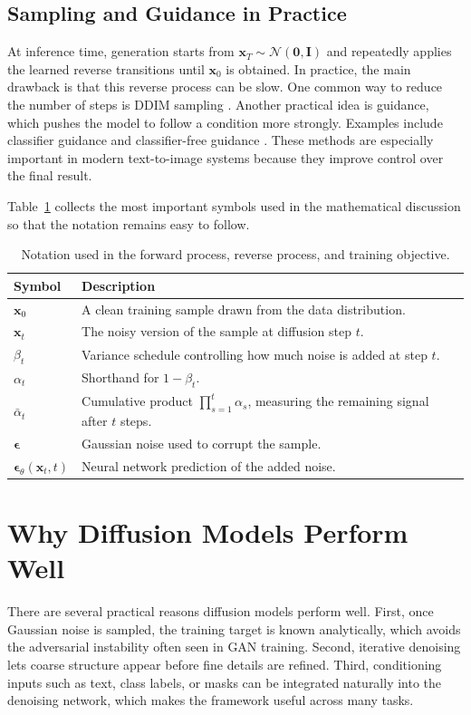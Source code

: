 \documentclass[a4paper,12pt]{article}
\newcommand{\vect}[1]{\bm{#1}}
\newcommand{\alphabar}{\bar{\alpha}}
\begin{document}
\subsection{Sampling and Guidance in Practice}
At inference time, generation starts from $\vect{x}_T \sim \mathcal{N}(\vect{0},\vect{I})$ and repeatedly applies the learned reverse transitions until $\vect{x}_0$ is obtained. In practice, the main drawback is that this reverse process can be slow. One common way to reduce the number of steps is DDIM sampling \cite{song2020ddim}. Another practical idea is guidance, which pushes the model to follow a condition more strongly. Examples include classifier guidance and classifier-free guidance \cite{dhariwal2021diffusion,ho2022classifierfree}. These methods are especially important in modern text-to-image systems because they improve control over the final result.

Table~\ref{tab:notation} collects the most important symbols used in the mathematical discussion so that the notation remains easy to follow.

\begin{table}[H]
    \centering
    \begin{tabularx}{\linewidth}{>{\bfseries}p{2.2cm}X}
        \toprule
        Symbol & Description \\
        \midrule
        $\vect{x}_0$ & A clean training sample drawn from the data distribution. \\
        $\vect{x}_t$ & The noisy version of the sample at diffusion step $t$. \\
        $\beta_t$ & Variance schedule controlling how much noise is added at step $t$. \\
        $\alpha_t$ & Shorthand for $1-\beta_t$. \\
        $\alphabar_t$ & Cumulative product $\prod_{s=1}^{t}\alpha_s$, measuring the remaining signal after $t$ steps. \\
        $\vect{\epsilon}$ & Gaussian noise used to corrupt the sample. \\
        $\vect{\epsilon}_{\theta}(\vect{x}_t,t)$ & Neural network prediction of the added noise. \\
        \bottomrule
    \end{tabularx}
    \caption[Notation summary for diffusion models]{Notation used in the forward process, reverse process, and training objective.}
    \label{tab:notation}
\end{table}

\section{Why Diffusion Models Perform Well}
There are several practical reasons diffusion models perform well. First, once Gaussian noise is sampled, the training target is known analytically, which avoids the adversarial instability often seen in GAN training. Second, iterative denoising lets coarse structure appear before fine details are refined. Third, conditioning inputs such as text, class labels, or masks can be integrated naturally into the denoising network, which makes the framework useful across many tasks.
\end{document}
